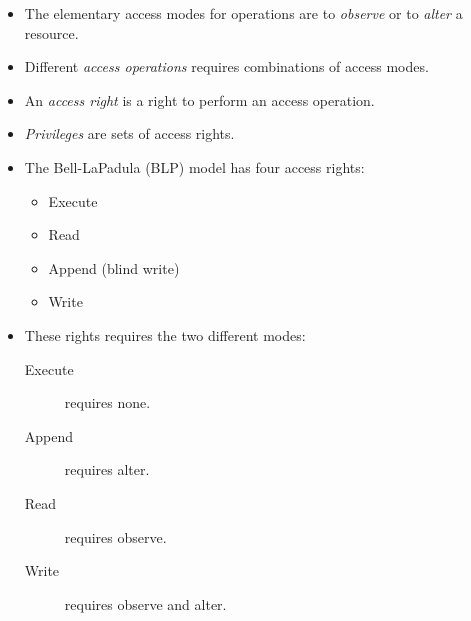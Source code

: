 \begin{frame}
  \begin{definition}
    \begin{itemize}
      \item The elementary access modes for operations are to \emph{observe} or 
        to \emph{alter} a resource.

      \item Different \emph{access operations} requires combinations of access 
        modes.
    \end{itemize}
  \end{definition}

  \pause{}

  \begin{definition}
    \begin{itemize}
      \item An \emph{access right} is a right to perform an access operation.

      \item \emph{Privileges} are sets of access rights.
    \end{itemize}
  \end{definition}
\end{frame}

\begin{frame}
  \begin{example}[BLP]
    \begin{itemize}
      \item The Bell-LaPadula (BLP) model has four access rights:
        \begin{itemize}
          \item Execute
          \item Read
          \item Append (blind write)
          \item Write
        \end{itemize}

      \item These rights requires the two different modes:
        \begin{description}
          \item[Execute] requires none.
          \item[Append] requires alter.
          \item[Read] requires observe.
          \item[Write] requires observe and alter.
        \end{description}
    \end{itemize}
  \end{example}
\end{frame}


